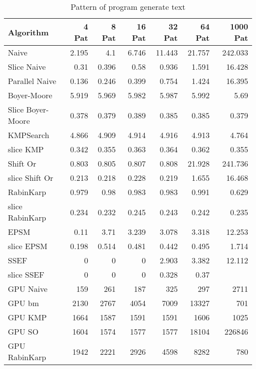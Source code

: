 \documentclass[11pt]{article}       %
\begin{document}
\begin{table}[htbp]
  \centering
  \caption{Pattern of program generate text}
    \begin{tabular}{lrrrrrr}\label{t3}
Algorithm & 4 Pat & 8 Pat & 16 Pat & 32 Pat & 64 Pat & 1000 Pat \\
 \hline
    Naive & 2.195 & 4.1   & 6.746 & 11.443 & 21.757 & 242.033 \\
    Slice Naive & 0.31  & 0.396 & 0.58  & 0.936 & 1.591 & 16.428 \\
    Parallel Naive & 0.136 & 0.246 & 0.399 & 0.754 & 1.424 & 16.395 \\
    {Boyer-Moore} & 5.919 & 5.969 & 5.982 & 5.987 & 5.992 & 5.69 \\
    Slice Boyer-Moore & 0.378 & 0.379 & 0.389 & 0.385 & 0.385 & 0.379 \\
    KMPSearch & 4.866 & 4.909 & 4.914 & 4.916 & 4.913 & 4.764 \\
    slice KMP & 0.342 & 0.355 & 0.363 & 0.364 & 0.362 & 0.355 \\
    Shift Or & 0.803 & 0.805 & 0.807 & 0.808 & 21.928 & 241.736 \\
    slice Shift Or & 0.213 & 0.218 & 0.228 & 0.219 & 1.655 & 16.468 \\
    RabinKarp & 0.979 & 0.98  & 0.983 & 0.983 & 0.991 & 0.629 \\
    slice RabinKarp & 0.234 & 0.232 & 0.245 & 0.243 & 0.242 & 0.235 \\
    EPSM  & 0.11  & 3.71  & 3.239 & 3.078 & 3.318 & 12.253 \\
    slice EPSM & 0.198 & 0.514 & 0.481 & 0.442 & 0.495 & 1.714 \\
    SSEF  & 0     & 0     & 0     & 2.903 & 3.382 & 12.112 \\
    slice SSEF & 0 & 0 & 0 & 0.328 & 0.37  &  \\
    GPU Naive & 159   & 261   & 187   & 325   & 297   & 2711 \\
    GPU bm & 2130  & 2767  & 4054  & 7009  & 13327 & 701 \\
    GPU KMP & 1664  & 1587  & 1591  & 1591  & 1606  & 1025 \\
    GPU SO & 1604  & 1574  & 1577  & 1577  & 18104 & 226846 \\
    GPU RabinKarp & 1942  & 2221  & 2926  & 4598  & 8282  & 780 \\

    \end{tabular}%
  \label{tab:addlabel}%
\end{table}%
\end{document}
